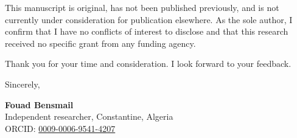 \documentclass[11pt,a4paper]{article}
\begin{document}
This manuscript is original, has not been published previously, and is not currently under consideration for publication elsewhere. As the sole author, I confirm that I have no conflicts of interest to disclose and that this research received no specific grant from any funding agency.

Thank you for your time and consideration. I look forward to your feedback.

\vspace{2em}

\noindent Sincerely,

\vspace{2em}

\noindent \textbf{Fouad Bensmail}\\
Independent researcher, Constantine, Algeria\\
ORCID: \href{https://orcid.org/0009-0006-9541-4207}{0009-0006-9541-4207}
\end{document}
